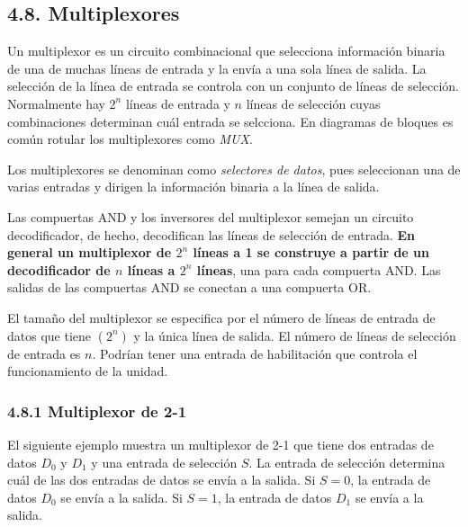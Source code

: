 \subsection*{4.8. Multiplexores}
Un multiplexor es un circuito combinacional que selecciona informaci\'{o}n binaria de una de muchas l\'{i}neas
de entrada y la env\'{i}a a una sola l\'{i}nea de salida. La selecci\'{o}n de la l\'{i}nea de entrada se controla
con un conjunto de l\'{i}neas de selecci\'{o}n. Normalmente hay $2^n$ l\'{i}neas de entrada y $n$ l\'{i}neas de
selecci\'{o}n cuyas combinaciones determinan cu\'{a}l entrada se selcciona. En diagramas de bloques es com\'{u}n
rotular los multiplexores como \textit{MUX}.

Los multiplexores se denominan como \textit{selectores de datos}, pues seleccionan una de varias entradas y dirigen
la informaci\'{o}n binaria a la l\'{i}nea de salida.

Las compuertas AND y los inversores del multiplexor semejan un circuito decodificador, de hecho, decodifican las l\'{i}neas
de selecci\'{o}n de entrada. \textbf{En general un multiplexor de $2^n$ l\'{i}neas a 1 se construye a partir de un decodificador de
$n$ l\'{i}neas a $2^n$ l\'{i}neas}, una para cada compuerta AND. Las salidas de las compuertas AND se conectan a una compuerta OR.

El tama\~{n}o del multiplexor se especifica por el n\'{u}mero de l\'{i}neas de entrada de datos que tiene $(2^n)$ y la \'{u}nica l\'{i}nea
de salida. El n\'{u}mero de l\'{i}neas de selecci\'{o}n de entrada es $n$. Podr\'{i}an tener una entrada de habilitaci\'{o}n que
controla el funcionamiento de la unidad.

\subsubsection*{4.8.1 Multiplexor de 2-1}

El siguiente ejemplo muestra un multiplexor de 2-1 que tiene dos entradas de datos $D_0$ y $D_1$ y una entrada de selecci\'{o}n $S$.
La entrada de selecci\'{o}n determina cu\'{a}l de las dos entradas de datos se env\'{i}a a la salida. Si $S = 0$, la entrada de datos $D_0$
se env\'{i}a a la salida. Si $S = 1$, la entrada de datos $D_1$ se env\'{i}a a la salida.

